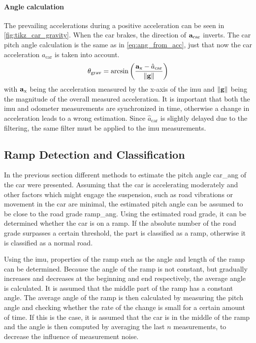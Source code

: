 \paragraph{Angle calculation}\mbox{}

The prevailing accelerations during a positive acceleration can be seen in \cref{fig:tikz_car_gravity}.
When the car brakes, the direction of $\vb{a}_\mathrm{car}$ inverts.
The car pitch angle calculation is the same as in \cref{eq:ang_from_acc}, just that now the car acceleration $a_\mathrm{car}$ is taken into account.
\begin{equation}
    \label{eq:ang_from_acc_gravity}
    \theta_\mathrm{grav}  = \arcsin\left(\frac{\vb{a}_\mathrm{x} - \hat{a}_\mathrm{car}}{\norm{\vb{g}}}\right)
\end{equation}
with $\vb{a}_\mathrm{x}$ being the acceleration measured by the x-axis of the \gls{imu} and $\norm{\vb{g}}$ being the magnitude of the overall measured acceleration.
It is important that both the \gls{imu} and odometer measurements are synchronized in time, otherwise a change in acceleration leads to a wrong estimation.
Since $\hat{a}_\mathrm{car}$ is slightly delayed due to the filtering, the same filter must be applied to the \gls{imu} measurements.


\subsection{Ramp Detection and Classification}
\label{ssec:ramp_detection_imu}
In the previous section different methods to estimate the pitch angle \gls{car_ang} of the car were presented.
Assuming that the car is accelerating moderately and other factors which might engage the suspension, such as road vibrations or movement in the car are minimal, the estimated pitch angle can be assumed to be close to the road grade \gls{ramp_ang}.
Using the estimated road grade, it can be determined whether the car is on a ramp.
If the absolute number of the road grade surpasses a certain threshold, the part is classified as a ramp, otherwise it is classified as a normal road.

Using the \gls{imu}, properties of the ramp such as the angle and length of the ramp can be determined.
Because the angle of the ramp is not constant, but gradually increases and decreases at the beginning and end respectively, the average angle is calculated.
It is assumed that the middle part of the ramp has a constant angle.
The average angle of the ramp is then calculated by measuring the pitch angle and checking whether the rate of the change is small for a certain amount of time.
If this is the case, it is assumed that the car is in the middle of the ramp and the angle is then computed by averaging the last $n$ measurements, to decrease the influence of measurement noise.

